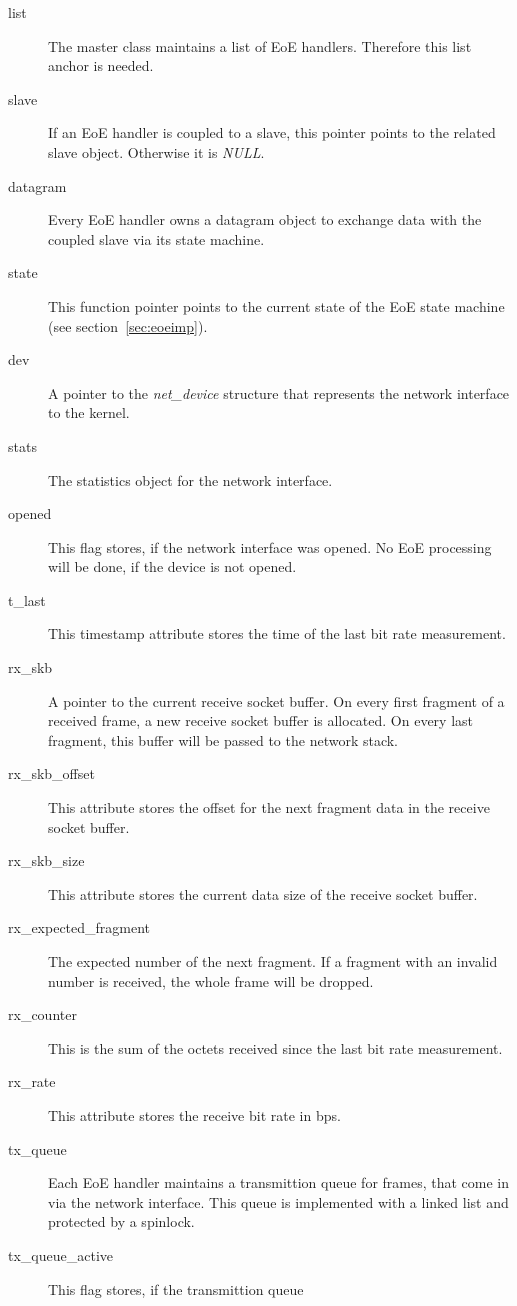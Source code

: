\documentclass[a4paper,12pt,BCOR6mm,bibtotoc,idxtotoc]{scrbook}
\begin{document}
\begin{description}
\item[list] The master class maintains a list of EoE handlers.
  Therefore this list anchor is needed.
\item[slave] If an EoE handler is coupled to a slave, this pointer
  points to the related slave object. Otherwise it is \textit{NULL}.
\item[datagram] Every EoE handler owns a datagram object to exchange
  data with the coupled slave via its state machine.
\item[state] This function pointer points to the current state of the
  EoE state machine (see section~\ref{sec:eoeimp}).
\item[dev] A pointer to the \textit{net\_device} structure that
  represents the network interface to the kernel.
\item[stats] The statistics object for the network interface.
\item[opened] This flag stores, if the network interface was opened.
  No EoE processing will be done, if the device is not opened.
\item[t\_last] This timestamp attribute stores the time of the last
  bit rate measurement.
\item[rx\_skb] A pointer to the current receive socket buffer. On
  every first fragment of a received frame, a new receive socket
  buffer is allocated. On every last fragment, this buffer will be
  passed to the network stack.
\item[rx\_skb\_offset] This attribute stores the offset for the next
  fragment data in the receive socket buffer.
\item[rx\_skb\_size] This attribute stores the current data size of
  the receive socket buffer.
\item[rx\_expected\_fragment] The expected number of the next
  fragment. If a fragment with an invalid number is received, the
  whole frame will be dropped.
\item[rx\_counter] This is the sum of the octets received since the
  last bit rate measurement.
\item[rx\_rate] This attribute stores the receive bit rate in bps.
\item[tx\_queue] Each EoE handler maintains a transmittion queue for
  frames, that come in via the network interface. This queue is
  implemented with a linked list and protected by a spinlock.
\item[tx\_queue\_active] This flag stores, if the transmittion queue

\end{description}
\end{document}
